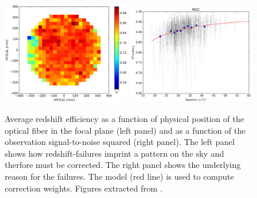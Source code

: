 \begin{figure}
    \centering 
    \includegraphics[width=0.49\textwidth]{fig/galaxies/eboss_z_failures_focalplane.png}
    \includegraphics[width=0.49\textwidth]{fig/galaxies/eboss_z_failures_sn.png}
    \caption{ 
        Average redshift efficiency as a function of physical position of the optical 
        fiber in the focal plane (left panel) and as a function of the observation
        signal-to-noise squared (right panel).  
        The left panel shows how redshift-failures imprint a pattern on the sky 
        and therfore must be corrected. The right panel shows the underlying reason 
        for the failures. The model (red line) is used to compute correction weights.
    Figures extracted from \cite{bautistaSDSSIVExtendedBaryon2018}.} 
    \label{fig:eboss_zfailures}
\end{figure}

